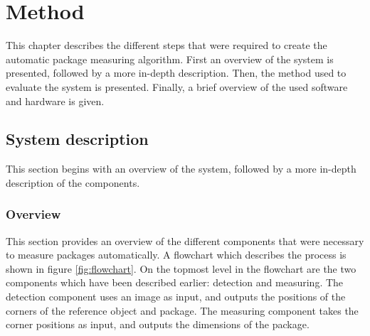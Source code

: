 \chapter{Method}
This chapter describes the different steps that were required to create the automatic package measuring algorithm.
First an overview of the system is presented, followed by a more in-depth description.
Then, the method used to evaluate the system is presented.
Finally, a brief overview of the used software and hardware is given.

\section{System description} \label{method:implementation}
This section begins with an overview of the system, followed by a more in-depth description of the components.

\subsection{Overview}
This section provides an overview of the different components that were necessary to measure packages automatically.
A flowchart which describes the process is shown in figure \ref{fig:flowchart}.
On the topmost level in the flowchart are the two components which have been described earlier: detection and measuring. 
The detection component uses an image as input, and outputs the positions of the corners of the reference object and package.
The measuring component takes the corner positions as input, and outputs the dimensions of the package.

